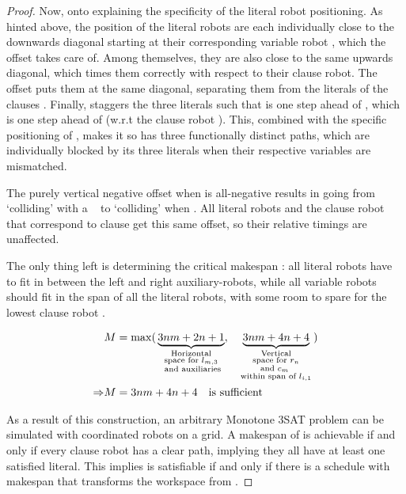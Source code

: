 \begin{proof}
	Now, onto explaining the specificity of the literal robot positioning. As hinted above, the position of the literal robots  are each individually close to the downwards diagonal starting at their corresponding variable robot , which the offset  takes care of. Among themselves, they are also close to the same upwards diagonal, which times them correctly with respect to their clause robot. The offset  puts them at the same diagonal, separating them from the literals of the clauses . Finally,  staggers the three literals such that  is one step ahead of , which is one step ahead of  (w.r.t the clause robot ). This, combined with the specific positioning of , makes it so  has three functionally distinct paths, which are individually blocked by its three literals when their respective variables are mismatched.

	The purely vertical negative offset \ilmath{\phi} when  is all-negative results in  going from `colliding' with a \false\  to `colliding' when . All literal robots  and the clause robot  that correspond to clause  get this same offset, so their relative timings are unaffected.
	
	The only thing left is determining the critical makespan : all literal robots have to fit in between the left and right auxiliary-robots, while all variable robots should fit in the span of all the literal robots, with some room to spare for the lowest clause robot .

	\begin{align*}
		& M = \max (\, 
			\underbrace{3nm + 2n + 1}_{
				\substack{
					\text{Horizontal} \\
					\text{space for \( l_{m,3} \)} \\
					\text{ and auxiliaries}
				}
			}, \quad
			\underbrace{3nm + 4n + 4}_{
				\substack{
					\text{Vertical} \\
					\text{space for \( r_n \)} \\
					\text{and \( c_m \) } \\
					\text{within span of \( l_{i,1} \)}
				}
			}
		 \,) \\
		\Rightarrow & M = 3nm + 4n + 4 \quad \text{is sufficient}
	\end{align*}

	As a result of this construction, an arbitrary Monotone 3SAT problem can be simulated with coordinated robots on a grid. A makespan of  is achievable if and only if every clause robot has a clear path, implying they all have at least one satisfied literal. This implies \ilmath{\varphi} is satisfiable if and only if there is a schedule with makespan  that transforms the workspace from .
\end{proof}


